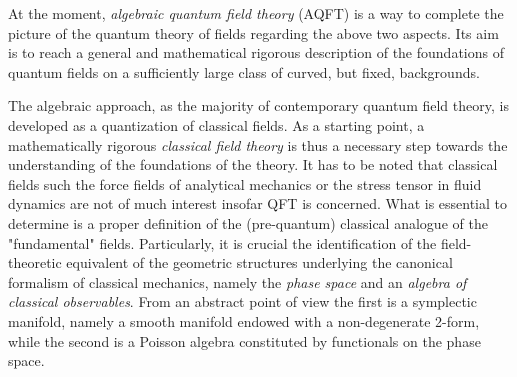 \documentclass[Main]{subfiles}
\begin{document}
At the moment, \emph{algebraic quantum field theory} (AQFT) is %
a way to complete the picture of the quantum theory of fields regarding the above two aspects.
Its aim is to reach a general and mathematical rigorous description of the foundations of quantum fields on a  sufficiently large class of curved, but fixed, backgrounds.

The algebraic approach, as the majority of contemporary quantum field theory, is developed as a quantization of classical fields.
As a starting point, a mathematically rigorous \emph{classical field theory}  is thus a necessary step towards the understanding of the foundations of  the theory.
It has to be noted that classical fields such the force fields of analytical mechanics or the stress tensor in fluid dynamics are not of much interest  insofar QFT is concerned. %
What is essential to determine is a proper definition of the (pre-quantum) classical analogue of the "fundamental" fields.
Particularly, it is crucial the identification of the field-theoretic equivalent of the geometric structures underlying the canonical formalism of classical mechanics, namely the \emph{phase space} and an \emph{algebra of classical observables}. 
From an abstract point of view  the first is a symplectic manifold, namely a smooth manifold endowed with a non-degenerate 2-form, while the second is a Poisson algebra constituted by functionals on the phase space.
\end{document}
